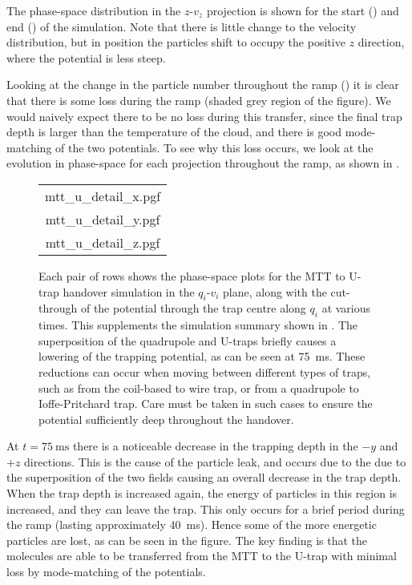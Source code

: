 The phase-space distribution in the $z$-$v_z$ projection is shown for the start
() and end
() of the simulation. Note that there is
little change to the velocity distribution, but in position the particles shift
to occupy the positive $z$ direction, where the potential is less steep.

Looking at the change in the particle number throughout the ramp
() it is clear that there is some loss
during the ramp (shaded grey region of the figure). We would naively expect
there to be no loss during this transfer, since the final trap depth is larger
than the temperature of the cloud, and there is good mode-matching of the two
potentials. To see why this loss occurs, we  look at the evolution in
phase-space for each projection throughout the ramp, as shown in
.

\begin{figure}[htp]
\centering
  \begin{tabular}{c}
  {mtt_u_detail_x.pgf} \\
  {mtt_u_detail_y.pgf} \\
  {mtt_u_detail_z.pgf}
  \end{tabular}
  \caption{
    Each pair of rows shows the phase-space plots for the MTT to U-trap
    handover simulation in the $q_i$-$v_i$ plane, along with the cut-through of
    the potential through the trap centre along $q_i$ at various times. This
    supplements the simulation summary shown in .
    The superposition of the quadrupole and U-traps briefly causes a lowering
    of the trapping potential, as can be seen at \SI{75}{\milli\second}. These
    reductions can occur when moving between different types of traps, such as
    from the coil-based to wire trap, or from a quadrupole to Ioffe-Pritchard
    trap. Care must be taken in such cases to ensure the potential sufficiently
    deep throughout the handover.
}
  \label{sim:fig:mttudetail}
\end{figure}

At $t=\SI{75}{\milli\second}$ there is a noticeable decrease in the trapping
depth in the $-y$ and $+z$ directions. This is the cause of the particle leak,
and occurs due to the due to the superposition of the two fields causing an
overall decrease in the trap depth. When the trap depth is increased again, the
energy of particles in this region is increased, and they can leave the trap.
This only occurs for a brief period during the ramp (lasting approximately
\SI{40}{\milli\second}).  Hence some of the more energetic particles are lost,
as can be seen in the figure. The key finding is that the molecules are able to
be transferred from the MTT to the U-trap with minimal loss by mode-matching of
the potentials.

